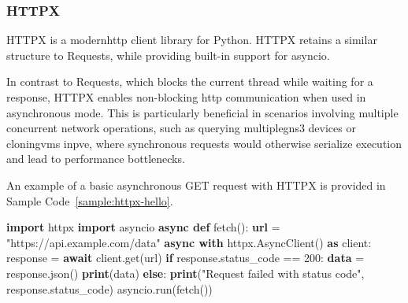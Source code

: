     \subsubsection{HTTPX}

      HTTPX\cite{httpx2025} is a modern\ac{http} client library for Python. HTTPX retains a similar structure to 
      Requests, while providing  built-in support for asyncio.

      In contrast to Requests, which blocks the current thread while waiting for a response, HTTPX enables non-blocking 
      \ac{http} communication when used in asynchronous mode. This is particularly beneficial in scenarios involving multiple 
      concurrent network operations, such as querying multiple\ac{gns3} devices or cloning\ac{vm}s  in\ac{pve}, 
      where synchronous requests would otherwise serialize execution and lead to performance bottlenecks.

      An example of a basic asynchronous GET request with HTTPX is provided in Sample Code~\ref{sample:httpx-hello}.

      \begin{algorithm}
        \caption{Making an Asynchronous HTTP Request Using HTTPX}\label{httpx-basic}
        \begin{algorithmic}[1]
          \State \textbf{import} httpx
          \State \textbf{import} asyncio
          \State
          \State \textbf{async def} fetch():
          \State \hspace{1em} \textbf{url} = "https://api.example.com/data"
          \State \hspace{1em} \textbf{async with} httpx.AsyncClient() \textbf{as} client:
          \State \hspace{2em} response = \textbf{await} client.get(url)
          \State \hspace{2em} \textbf{if} response.status\_code == 200:
          \State \hspace{3em} \textbf{data} = response.json()
          \State \hspace{3em} \textbf{print}(data)
          \State \hspace{2em} \textbf{else}:
          \State \hspace{3em} \textbf{print}("Request failed with status code", response.status\_code)
          \State
          \State asyncio.run(fetch())
        \end{algorithmic}
        \label{sample:httpx-hello}
      \end{algorithm}

